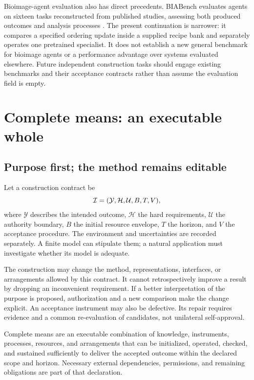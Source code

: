 Bioimage-agent evaluation also has direct precedents. BIABench evaluates agents on sixteen tasks reconstructed from published studies, assessing both produced outcomes and analysis processes \citep{pan2026}. The present continuation is narrower: it compares a specified ordering update inside a supplied recipe bank and separately operates one pretrained specialist. It does not establish a new general benchmark for bioimage agents or a performance advantage over systems evaluated elsewhere. Future independent construction tasks should engage existing benchmarks and their acceptance contracts rather than assume the evaluation field is empty.

\section{Complete means: an executable whole}
\label{sec:means}

\subsection{Purpose first; the method remains editable}

Let a construction contract be
\begin{equation}
\mathcal{I}=(\mathcal Y,\mathcal H,\mathcal U,B,T,V),
\label{eq:contract}
\end{equation}
where $\mathcal Y$ describes the intended outcome, $\mathcal H$ the hard requirements, $\mathcal U$ the authority boundary, $B$ the initial resource envelope, $T$ the horizon, and $V$ the acceptance procedure. The environment and uncertainties are recorded separately. A finite model can stipulate them; a natural application must investigate whether its model is adequate.

The construction may change the method, representations, interfaces, or arrangements allowed by this contract. It cannot retrospectively improve a result by dropping an inconvenient requirement. If a better interpretation of the purpose is proposed, authorization and a new comparison make the change explicit. An acceptance instrument may also be defective. Its repair requires evidence and a common re-evaluation of candidates, not unilateral self-approval.

\begin{definition}
Complete means are an executable combination of knowledge, instruments, processes, resources, and arrangements that can be initialized, operated, checked, and sustained sufficiently to deliver the accepted outcome within the declared scope and horizon. Necessary external dependencies, permissions, and remaining obligations are part of that declaration.
\end{definition}


